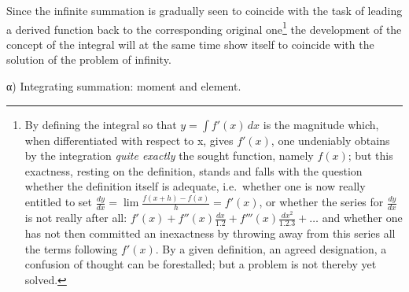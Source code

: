 \documentclass[12pt,a4paper,openany]{book}
\newcommand{\opage}[1]{\marginnote{\footnotesize\textit{[#1]}}}
\begin{document}
Since the infinite summation
is gradually seen to coincide with the task
of leading a derived function back to the corresponding original one\footnote[2]{By defining the integral so that $y=\int f'(x)\,dx$ is the magnitude which, when differentiated with respect to x, gives $f'(x)$, one undeniably obtains by the integration \emph{quite exactly} the sought function, namely $f(x)$; but this exactness, resting on the definition, stands and falls with the question whether the definition itself is adequate, i.e.\ whether one is now really entitled to set $\frac{dy}{dx}=\lim\frac{f(x+h)-f(x)}{h}=f'(x)$, or whether the series for $\frac{dy}{dx}$ is not really after all: $f'(x)+f''(x)\frac{dx}{1.2}+f'''(x)\frac{dx^{2}}{1.2.3}+\ldots$ and whether one has not then committed an inexactness by throwing away from this series all the terms following $f'(x)$. By a given definition, an agreed designation, a confusion of thought can be forestalled; but a problem is not thereby yet solved.}
the development of the concept of the integral will at the same time show
itself to coincide with the solution of the problem of infinity.
\setcounter{footnote}{0}%
\opage{99}
\begin{center}α) Integrating summation: moment and element.\end{center}
\end{document}
